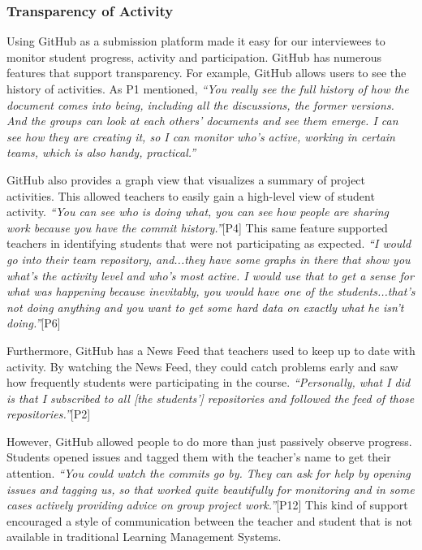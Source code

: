 \subsubsection{Transparency of Activity}
Using GitHub as a submission platform made it easy for our interviewees to monitor student progress, activity and participation. GitHub has numerous features that support transparency. For example, GitHub allows users to see the history of activities. As P1 mentioned, \textit{``You really see the full history of how the document comes into being, including all the discussions, the former versions. And the groups can look at each others' documents and see them emerge. I can see how they are creating it, so I can monitor who's active, working in certain teams, which is also handy, practical.''}

GitHub also provides a graph view that visualizes a summary of project activities. This allowed teachers to easily gain a high-level view of student activity. \textit{``You can see who is doing what, you can see how people are sharing work because you have the commit history.''}[P4] This same feature supported teachers in identifying students that were not participating as expected. \textit{``I would go into their team repository, and...they have some graphs in there that show you what's the activity level and who's most active. I would use that to get a sense for what was happening because inevitably, you would have one of the students...that's not doing anything and you want to get some hard data on exactly what he isn't doing.''}[P6]

Furthermore, GitHub has a News Feed that teachers used to keep up to date with activity. By watching the News Feed, they could catch problems early and saw how frequently students were participating in the course. \textit{``Personally, what I did is that I subscribed to all [the students'] repositories and followed the feed of those repositories.''}[P2]

However, GitHub allowed people to do more than just passively observe progress. Students opened issues and tagged them with the teacher's name to get their attention. \textit{``You could watch the commits go by. They can ask for help by opening issues and tagging us, so that worked quite beautifully for monitoring and in some cases actively providing advice on group project work.''}[P12] This kind of support encouraged a style of communication between the teacher and student that is not available in traditional Learning Management Systems.


